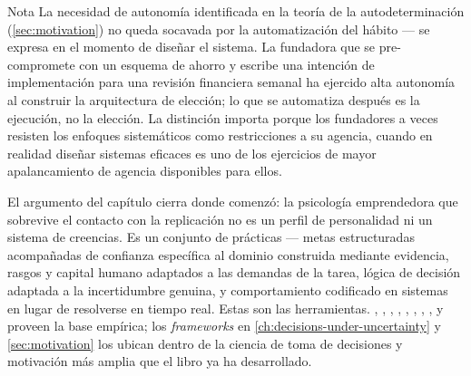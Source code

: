 \begin{admonition}{Nota}
La necesidad de autonomía identificada en la teoría de la autodeterminación (\cref{sec:motivation})
no queda socavada por la automatización del hábito --- se expresa en el momento de diseñar el
sistema. La fundadora que se pre-compromete con un esquema de ahorro y escribe una intención de
implementación para una revisión financiera semanal ha ejercido alta autonomía al construir la
arquitectura de elección; lo que se automatiza después es la ejecución, no la elección. La
distinción importa porque los fundadores a veces resisten los enfoques sistemáticos como
restricciones a su agencia, cuando en realidad diseñar sistemas eficaces es uno de los ejercicios
de mayor apalancamiento de agencia disponibles para ellos.
\end{admonition}

El argumento del capítulo cierra donde comenzó: la psicología emprendedora que sobrevive el
contacto con la replicación no es un perfil de personalidad ni un sistema de creencias. Es un
conjunto de prácticas --- metas estructuradas acompañadas de confianza específica al dominio
construida mediante evidencia, rasgos y capital humano adaptados a las demandas de la tarea,
lógica de decisión adaptada a la incertidumbre genuina, y comportamiento codificado en sistemas
en lugar de resolverse en tiempo real. Estas son las herramientas. \textcite{bandura1997self},
\textcite{stajkovic1998self}, \textcite{locke2002building}, \textcite{rauch2007person},
\textcite{unger2011human}, \textcite{ericsson1993role}, \textcite{sarasvathy2001causation},
\textcite{lally2010habit}, \textcite{gollwitzer2006implementation} y \textcite{thaler2004save}
proveen la base empírica; los \emph{frameworks} en \cref{ch:decisions-under-uncertainty} y
\cref{sec:motivation} los ubican dentro de la ciencia de toma de decisiones y motivación más
amplia que el libro ya ha desarrollado.
